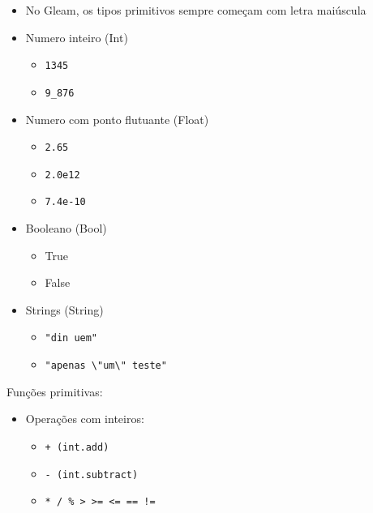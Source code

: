 \documentclass[12pt]{article}
\begin{document}
\begin{itemize}
    \item No Gleam, os tipos primitivos sempre começam com letra maiúscula
    \item Numero inteiro (Int)
    \begin{itemize}
        \item \verb|1345|
        \item \verb|9_876|
    \end{itemize}
    \item Numero com ponto flutuante (Float)
    \begin{itemize}
        \item \verb|2.65|
        \item \verb|2.0e12| 
        \item \verb|7.4e-10|
    \end{itemize}
    \item Booleano (Bool)
    \begin{itemize}
        \item True
        \item False
    \end{itemize}
    \item Strings (String)
    \begin{itemize}
        \item \verb|"din uem"|
        \item \verb|"apenas \"um\" teste"|
    \end{itemize}
\end{itemize}
Funções primitivas:
\begin{itemize}
    \item Operações com inteiros:
    \begin{itemize}
        \item \verb|+ (int.add)|
        \item \verb|- (int.subtract)|
        \item \verb|* / % > >= <= == !=| 
    \end{itemize}
\end{itemize}
\end{document}
